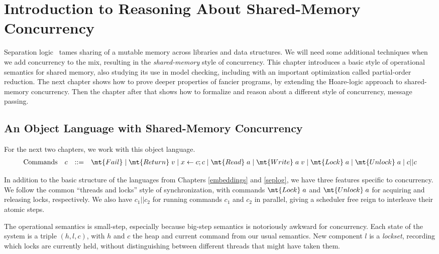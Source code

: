 \documentclass{amsbook}
\theoremstyle{definition}
\theoremstyle{remark}
\numberwithin{section}{chapter}
\numberwithin{equation}{chapter}
\begin{document}

\chapter{Introduction to Reasoning About Shared-Memory Concurrency}\label{sharedmem}

Separation logic~ tames sharing of a mutable memory across libraries and data structures.
We will need some additional techniques when we add concurrency to the mix, resulting in the \emph{shared-memory} style of concurrency.
This chapter introduces a basic style of operational semantics for shared memory, also studying its use in model checking, including with an important optimization called partial-order reduction.
The next chapter shows how to prove deeper properties of fancier programs, by extending the Hoare-logic approach to shared-memory concurrency.
Then the chapter after that shows how to formalize and reason about a different style of concurrency, message passing.

\section{An Object Language with Shared-Memory Concurrency}

For the next two chapters, we work with this object language.
$$\begin{array}{rrcl}
  \textrm{Commands} & c &::=& \mt{Fail} \mid \mt{Return} \; v \mid x \leftarrow c; c \mid \mt{Read} \; a \mid \mt{Write} \; a \; v \mid \mt{Lock} \; a \mid \mt{Unlock} \; a \mid c || c
\end{array}$$

In addition to the basic structure of the languages from Chapters \ref{embeddings} and \ref{seplog}, we have three features specific to concurrency.
We follow the common ``threads and locks'' style of synchronization, with commands $\mt{Lock} \; a$ and $\mt{Unlock} \; a$ for acquiring and releasing locks, respectively.
We also have $c_1 || c_2$ for running commands $c_1$ and $c_2$ in parallel, giving a scheduler free reign to interleave their atomic steps.

The operational semantics is small-step, especially because big-step semantics is notoriously awkward for concurrency.
Each state of the system is a triple $(h, l, c)$, with $h$ and $c$ the heap and current command from our usual semantics.
New component $l$ is a \emph{lockset}, recording which locks are currently held, without distinguishing between different threads that might have taken them.
\end{document}

